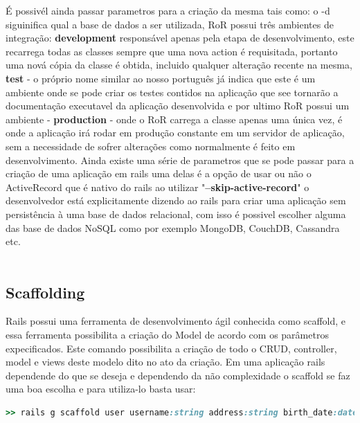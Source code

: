É possivél ainda passar parametros para a criação da mesma tais como:
o -d siguinifica qual a base de dados a ser utilizada, RoR possui três ambientes de integração: \textbf{development} responsável apenas pela etapa de desenvolvimento, 
este recarrega todas as classes sempre que uma nova action é requisitada, portanto uma nová cópia da classe é obtida, incluido qualquer alteração recente na mesma,
\textbf{test} - o próprio nome similar ao nosso português já indica que este é um ambiente onde se pode criar os testes contidos na aplicação que see tornarão a documentação
executavel da aplicação desenvolvida e por ultimo RoR possui um ambiente - \textbf{production} - onde o RoR carrega a classe apenas uma única vez, é onde a aplicação irá rodar em produção constante em um servidor de aplicação,
sem a necessidade de sofrer alterações como normalmente é feito em desenvolvimento. Ainda existe uma série de parametros que se pode passar para a criação de uma aplicação em rails uma delas é a opção de usar ou não o ActiveRecord
que é nativo do rails ao utilizar "\textbf{--skip-active-record}" o desenvolvedor está explicitamente dizendo ao rails para criar uma aplicação sem persistência à uma base de dados relacional, com isso é possivel escolher alguma das
base de dados NoSQL como por exemplo MongoDB, CouchDB, Cassandra etc.
\\
\\
\subsection{Scaffolding}
Rails possui uma ferramenta de desenvolvimento ágil conhecida como scaffold, e essa ferramenta possibilita a criação do Model de acordo com os parâmetros expecificados.
Este comando possibilita a criação de todo o CRUD, controller, model e views deste modelo dito no ato da criação. Em uma aplicação rails dependende do que se deseja e dependendo 
da não complexidade o scaffold se faz uma boa escolha e para utiliza-lo basta usar:

{\singlespace
\begin{lstlisting}[caption=Exemplo de uso de scaffold, language=Ruby,label={scaffold}]
  >> rails g scaffold user username:string address:string birth_date:date
\end{lstlisting}
}

